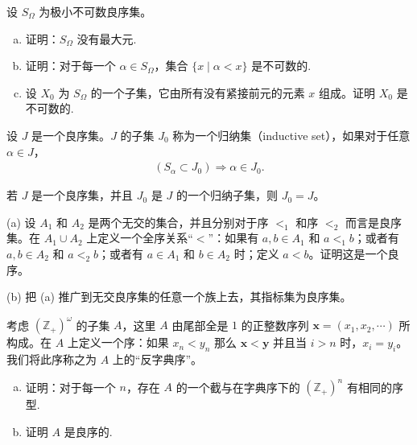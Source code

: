 \documentclass[../../main.tex]{subfiles}
\begin{document}
\begin{exercise}\label{exercise:ch01-良序集-6}
设 $S_{\Omega}$ 为极小不可数良序集。
\begin{enumerate}[(a)]
\item 证明：$S_{\Omega}$ 没有最大元.
\item 证明：对于每一个 $\alpha \in S_{\Omega}$，集合 $\{x \mid \alpha < x\}$ 是不可数的.
\item 设 $X_{0}$ 为 $S_{\Omega}$ 的一个子集，它由所有没有紧接前元的元素 $x$ 组成。证明 $X_{0}$ 是不可数的.
\end{enumerate}
\end{exercise}

\begin{exercise}\label{exercise:ch01-良序集-7}
设 $J$ 是一个良序集。$J$ 的子集 $J_{0}$ 称为一个归纳集（inductive set），如果对于任意 $\alpha \in J$，
\begin{align*}
(S_{\alpha} \subset J_{0}) \Longrightarrow \alpha \in J_{0}.
\end{align*}

\begin{theorem}[超限归纳原理]\label{theorem:ch01-超限归纳}
若 $J$ 是一个良序集，并且 $J_{0}$ 是 $J$ 的一个归纳子集，则 $J_{0} = J$。
\end{theorem}
\end{exercise}

\begin{exercise}\label{exercise:ch01-良序集-8}
(a) 设 $A_{1}$ 和 $A_{2}$ 是两个无交的集合，并且分别对于序 $<_{1}$ 和序 $<_{2}$ 而言是良序集。在 $A_{1} \cup A_{2}$ 上定义一个全序关系“$<$”：如果有 $a, b \in A_{1}$ 和 $a <_{1} b$；或者有 $a, b \in A_{2}$ 和 $a <_{2} b$；或者有 $a \in A_{1}$ 和 $b \in A_{2}$ 时；定义 $a < b$。证明这是一个良序。

(b) 把 (a) 推广到无交良序集的任意一个族上去，其指标集为良序集。
\end{exercise}

\begin{exercise}\label{exercise:ch01-良序集-9}
考虑 $(\mathbb{Z}_{+})^{\omega}$ 的子集 $A$，这里 $A$ 由尾部全是 $1$ 的正整数序列 $\boldsymbol{x} = (x_{1}, x_{2}, \cdots)$ 所构成。在 $A$ 上定义一个序：如果 $x_{n} < y_{n}$ 那么 $\boldsymbol{x} < \boldsymbol{y}$ 并且当 $i > n$ 时，$x_{i} = y_{i}$。我们将此序称之为 $A$ 上的“反字典序”。
\begin{enumerate}[(a)]
\item 证明：对于每一个 $n$，存在 $A$ 的一个截与在字典序下的 $(\mathbb{Z}_{+})^{n}$ 有相同的序型.
\item 证明 $A$ 是良序的.
\end{enumerate}
\end{exercise}
\end{document}
